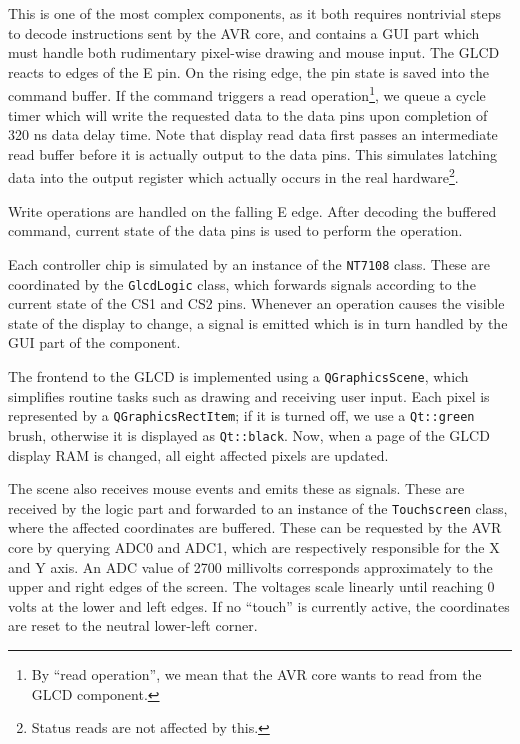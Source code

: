 This is one of the most complex components, as it both requires nontrivial steps
to decode instructions sent by the \ac{AVR} core, and contains a \ac{GUI} part
which must handle both rudimentary pixel-wise drawing and mouse input.
The \ac{GLCD} reacts to edges of the \ac{E} pin. On the rising edge, the pin state
is saved into the command buffer. If the command triggers a read operation\footnote{
%
By ``read operation'', we mean that the \ac{AVR} core wants to read from
the \ac{GLCD} component.
%
}, we queue a cycle timer which will write the requested data to the data pins
upon completion of 320 \ac{ns} data delay time. Note that display read data first passes an
intermediate read buffer before it is actually output to the data pins. This
simulates latching data into the output register which actually occurs in the real
hardware\footnote{
%
Status reads are not affected by this.
%
}.

Write operations are handled on the falling \ac{E} edge. After decoding the
buffered command, current state of the data pins is used to perform the operation.

Each controller chip is simulated by an instance of the \lstinline|NT7108| class.
These are coordinated by the \lstinline|GlcdLogic| class, which forwards signals
according to the current state of the \ac{CS1} and \ac{CS2} pins. Whenever an
operation causes the visible state of the display to change, a signal is emitted
which is in turn handled by the \ac{GUI} part of the component.

The frontend to the \ac{GLCD} is implemented using a \lstinline|QGraphicsScene|,
which simplifies routine tasks such as drawing and receiving user input. Each pixel
is represented by a \lstinline|QGraphicsRectItem|; if it is turned off, we use
a \lstinline|Qt::green| brush, otherwise it is displayed as \lstinline|Qt::black|.
Now, when a page of the \ac{GLCD} display \ac{RAM} is changed, all eight affected
pixels are updated.

The scene also receives mouse events and emits these as signals. These are received
by the logic part and forwarded to an instance of the \lstinline|Touchscreen| class,
where the affected coordinates are buffered. These can be requested by the \ac{AVR}
core by querying \ac{ADC}0 and \ac{ADC}1, which are respectively responsible
for the X and Y axis. An \ac{ADC} value of 2700 millivolts corresponds approximately
to the upper and right edges of the screen. The voltages scale linearly until
reaching 0 volts at the lower and left edges. If no ``touch'' is currently active,
the coordinates are reset to the neutral lower-left corner.


